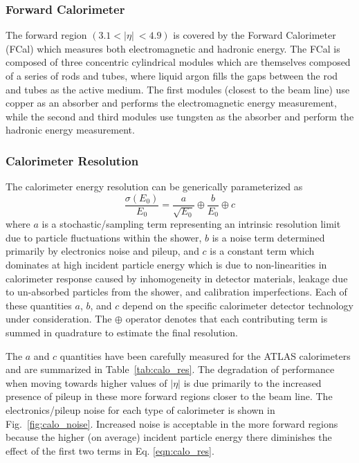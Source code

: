 \subsubsection{Forward Calorimeter}
The forward region $(3.1 < |\eta|\ < 4.9)$ is covered by the Forward Calorimeter (FCal) which measures both electromagnetic and hadronic energy.
The FCal is composed of three concentric cylindrical modules which are themselves composed of a series of rods and tubes, where liquid argon fills the gaps between the rod and tubes as the active medium.
The first modules (closest to the beam line) use copper as an absorber and performs the electromagnetic energy measurement, while the second and third modules use tungsten as the absorber and perform the hadronic energy measurement.

\subsubsection{Calorimeter Resolution}
The calorimeter energy resolution can be generically parameterized as
\begin{equation}
    \frac{\sigma(E_0)}{E_0} = \frac{a}{\sqrt{E_0}} \oplus \frac{b}{E_0} \oplus c
    \label{eqn:calo_res}
\end{equation}
where $a$ is a stochastic/sampling term representing an intrinsic resolution limit due to particle fluctuations within the shower, $b$ is a noise term determined primarily by electronics noise and pileup, and $c$ is a constant term which dominates at high incident particle energy which is due to non-linearities in calorimeter response caused by inhomogeneity in detector materials, leakage due to un-absorbed particles from the shower, and calibration imperfections.
Each of these quantities $a$, $b$, and $c$ depend on the specific calorimeter detector technology under consideration.
The $\oplus$ operator denotes that each contributing term is summed in quadrature to estimate the final resolution.

The $a$ and $c$ quantities have been carefully measured for the ATLAS calorimeters \cite{Aharrouche_2006} \cite{Strizenec:2009zz} \cite{Cojocaru:2004jk} \cite{Adragna:2009zz} and are summarized in Table~\ref{tab:calo_res}.
The degradation of performance when moving towards higher values of $|\eta|$ is due primarily to the increased presence of pileup in these more forward regions closer to the beam line.
The electronics/pileup noise for each type of calorimeter is shown in Fig.~\ref{fig:calo_noise}.
Increased noise is acceptable in the more forward regions because the higher (on average) incident particle energy there diminishes the effect of the first two terms in Eq. \ref{eqn:calo_res}.

